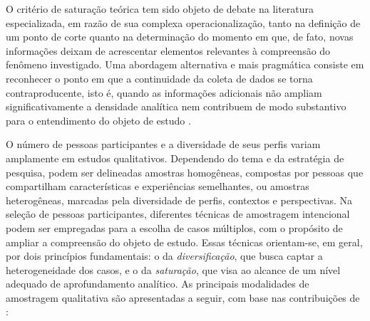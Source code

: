 \documentclass[12pt, a4paper, openany]{book}
\begin{document}
O crit\'erio de satura\c{c}\~ao te\'orica tem sido objeto de debate na literatura especializada, em raz\~ao de sua complexa operacionaliza\c{c}\~ao, tanto na defini\c{c}\~ao de um ponto de corte quanto na determina\c{c}\~ao do momento em que, de fato, novas informa\c{c}\~oes deixam de acrescentar elementos relevantes \`a compreens\~ao do fen\^omeno investigado. Uma abordagem alternativa e mais pragm\'atica consiste em reconhecer o ponto em que a continuidade da coleta de dados se torna contraproducente, isto \'e, quando as informa\c{c}\~oes adicionais n\~ao ampliam significativamente a densidade anal\'itica nem contribuem de modo substantivo para o entendimento do objeto de estudo \citep{mason2010sample}.

O n\'umero de pessoas participantes e a diversidade de seus perfis variam amplamente em estudos qualitativos. Dependendo do tema e da estrat\'egia de pesquisa, podem ser delineadas amostras homog\^eneas, compostas por pessoas que compartilham caracter\'isticas e experi\^encias semelhantes, ou amostras heterog\^eneas, marcadas pela diversidade de perfis, contextos e perspectivas. Na sele\c{c}\~ao de pessoas participantes, diferentes t\'ecnicas de amostragem intencional podem ser empregadas para a escolha de casos m\'ultiplos, com o prop\'osito de ampliar a compreens\~ao do objeto de estudo. Essas t\'ecnicas orientam-se, em geral, por dois princ\'ipios fundamentais: o da \textit{diversifica\c{c}\~ao}, que busca captar a heterogeneidade dos casos, e o da \textit{satura\c{c}\~ao}, que visa ao alcance de um n\'ivel adequado de aprofundamento anal\'itico. As principais modalidades de amostragem qualitativa s\~ao apresentadas a seguir, com base nas contribui\c{c}\~oes de \citet{pires2014amostragem}:
\end{document}
